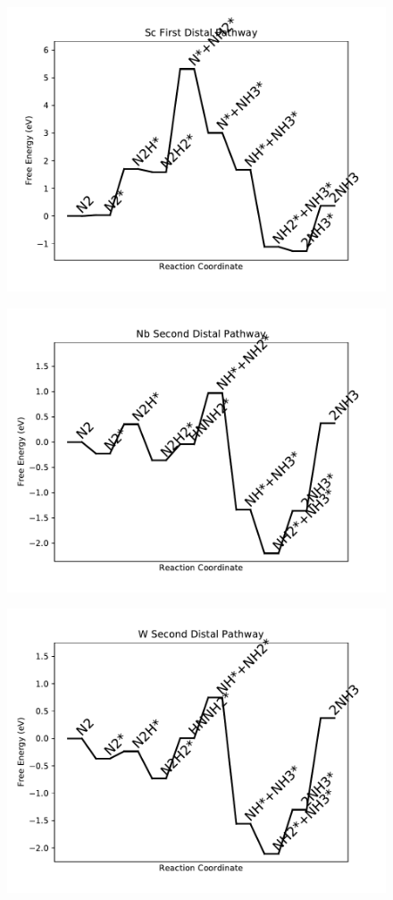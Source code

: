\begin{figure}
\centering
\includegraphics[width=0.8\linewidth]{data/plots/Sc_distal_1.pdf}
\end{figure}

\begin{figure}
\centering
\includegraphics[width=0.8\linewidth]{data/plots/Nb_distal_2.pdf}
\end{figure}

\begin{figure}
\centering
\includegraphics[width=0.8\linewidth]{data/plots/W_distal_2.pdf}
\end{figure}

